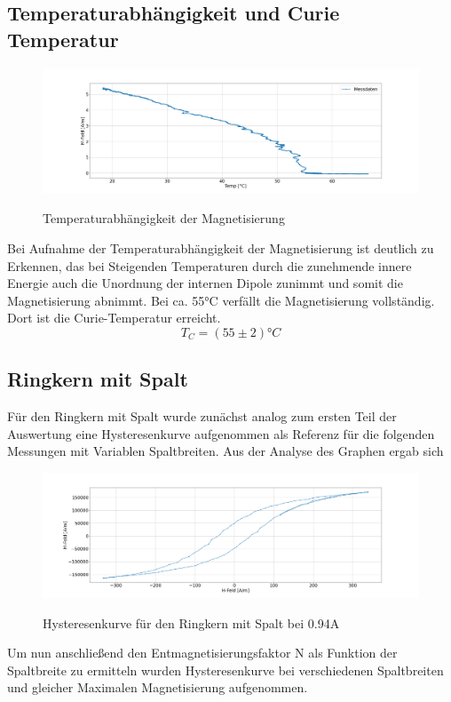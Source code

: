     \subsection{Temperaturabhängigkeit und Curie Temperatur}
        \begin{figure}[H]
            \centering
            \includegraphics[width=\textwidth]{Images/Teil3.png}
            \label{Temp}
            \caption{Temperaturabhängigkeit der Magnetisierung}
        \end{figure}
        Bei Aufnahme der Temperaturabhängigkeit der Magnetisierung ist deutlich zu Erkennen, das bei Steigenden Temperaturen durch die zunehmende innere Energie
        auch die Unordnung der internen Dipole zunimmt und somit die Magnetisierung abnimmt. Bei ca. 55°C verfällt die Magnetisierung vollständig. Dort ist die Curie-Temperatur erreicht.
        $$T_C  = (55 \pm 2)°C$$
    \subsection{Ringkern mit Spalt}
        Für den Ringkern mit Spalt wurde zunächst analog zum ersten Teil der Auswertung eine Hysteresenkurve aufgenommen als Referenz für die folgenden Messungen mit Variablen Spaltbreiten.
        Aus der Analyse des Graphen ergab sich
        \begin{figure}[H]
            \centering
            \includegraphics[width=\textwidth]{Images/Teil4.1.png}
            \label{Hyst4}
            \caption{Hysteresenkurve für den Ringkern mit Spalt bei 0.94A}
        \end{figure}
        Um nun anschließend den Entmagnetisierungsfaktor N als Funktion der Spaltbreite zu ermitteln wurden Hysteresenkurve bei verschiedenen Spaltbreiten und gleicher Maximalen Magnetisierung
        aufgenommen.